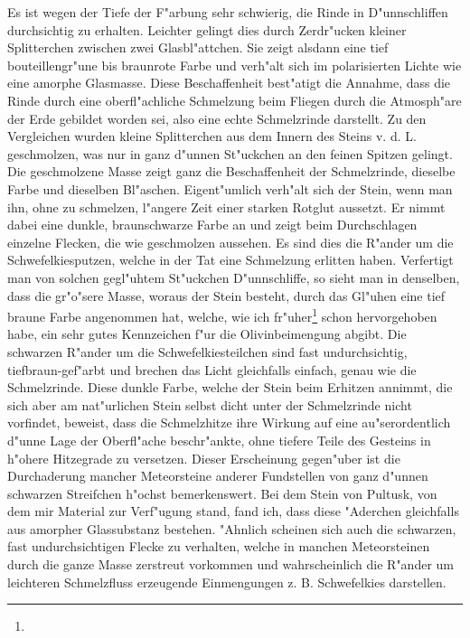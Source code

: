 \documentclass[a4paper, 11pt, oneside]{article}
\begin{document}
Es ist wegen der Tiefe der F"arbung sehr schwierig, die Rinde in D"unnschliffen durchsichtig zu erhalten. Leichter gelingt dies durch Zerdr"ucken kleiner Splitterchen zwischen zwei Glasbl"attchen. Sie zeigt alsdann eine tief bouteillengr"une bis braunrote Farbe und verh"alt sich im polarisierten Lichte wie eine amorphe Glasmasse. Diese Beschaffenheit best"atigt die Annahme, dass die Rinde durch eine oberfl"achliche Schmelzung beim Fliegen durch die Atmosph"are der Erde gebildet worden sei, also eine echte Schmelzrinde darstellt. Zu den Vergleichen wurden kleine Splitterchen aus dem Innern des Steins v. d. L. geschmolzen, was nur in ganz d"unnen St"uckchen an den feinen Spitzen gelingt. Die geschmolzene Masse zeigt ganz die Beschaffenheit der Schmelzrinde, dieselbe Farbe und dieselben Bl"aschen. Eigent"umlich verh"alt sich der Stein, wenn man ihn, ohne zu schmelzen, l"angere Zeit einer starken Rotglut aussetzt. Er nimmt dabei eine dunkle, braunschwarze Farbe an und zeigt beim Durchschlagen einzelne Flecken, die wie geschmolzen aussehen. Es sind dies die R"ander um die Schwefelkiesputzen, welche in der Tat eine Schmelzung erlitten haben. Verfertigt man von solchen gegl"uhtem St"uckchen D"unnschliffe, so sieht man in denselben, dass die gr"o"sere Masse, woraus der Stein besteht, durch das Gl"uhen eine tief braune Farbe angenommen hat, welche, wie ich fr"uher\footnote{} schon hervorgehoben habe, ein sehr gutes Kennzeichen f"ur die Olivinbeimengung abgibt. Die schwarzen R"ander um die Schwefelkiesteilchen sind fast undurchsichtig, tiefbraun-gef"arbt und brechen das Licht gleichfalls einfach, genau wie die Schmelzrinde. Diese dunkle Farbe, welche der Stein beim Erhitzen annimmt, die sich aber am nat"urlichen Stein selbst dicht unter der Schmelzrinde nicht vorfindet, beweist, dass die Schmelzhitze ihre Wirkung auf eine au"serordentlich d"unne Lage der Oberfl"ache beschr"ankte, ohne tiefere Teile des Gesteins in h"ohere Hitzegrade zu versetzen. Dieser Erscheinung gegen"uber ist die Durchaderung mancher Meteorsteine anderer Fundstellen von ganz d"unnen schwarzen Streifchen h"ochst bemerkenswert. Bei dem Stein von Pultusk, von dem mir Material zur Verf"ugung stand, fand ich, dass diese "Aderchen gleichfalls aus amorpher Glassubstanz bestehen. "Ahnlich scheinen sich auch die schwarzen, fast undurchsichtigen Flecke zu verhalten, welche in manchen Meteorsteinen durch die ganze Masse zerstreut vorkommen und wahrscheinlich die R"ander um leichteren Schmelzfluss erzeugende Einmengungen z. B. Schwefelkies darstellen.
\end{document}

